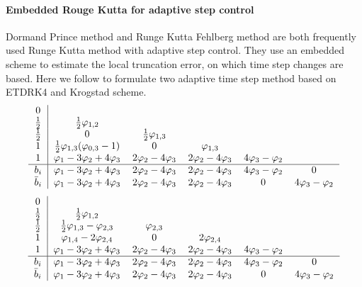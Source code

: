 \paragraph{Embedded Rouge Kutta for adaptive step control}
Dormand Prince method and Runge Kutta Fehlberg method
are
both frequently used Runge Kutta method with adaptive step control.
They use an embedded scheme to estimate the local truncation error, on which
time step changes are based. Here we follow to formulate two
adaptive time step method based on ETDRK4 and Krogstad scheme.
\begin{equation}
  \label{eq:etdrk4Adapt}
  \begin{tabular}{c | c c c c c}
    0 & & & & &\\
    $\frac{1}{2}$  & $\frac{1}{2}\varphi_{1, 2}$ &&&&\\
    $\frac{1}{2}$ & 0 & $\frac{1}{2}\varphi_{1, 3}$ &&&\\
    1 & $\frac{1}{2}\varphi_{1,3}(\varphi_{0,3}-1)$ & 0 & $\varphi_{1,3}$ & &\\
    1 & $\varphi_{1}-3\varphi_{2}+4\varphi_{3}$ & $2\varphi_{2}-4\varphi_{3}$
          & $2\varphi_{2}-4\varphi_{3}$ & $4\varphi_{3}-\varphi_{2}$ & \\
    \hline
    $b_i$  & $\varphi_{1}-3\varphi_{2}+4\varphi_{3}$ & $2\varphi_{2}-4\varphi_{3}$
          & $2\varphi_{2}-4\varphi_{3}$ & $4\varphi_{3}-\varphi_{2}$  & 0\\
   $\bar{b}_i$  & $\varphi_{1}-3\varphi_{2}+4\varphi_{3}$ & $2\varphi_{2}-4\varphi_{3}$
          & $2\varphi_{2}-4\varphi_{3}$ & 0 & $4\varphi_{3}-\varphi_{2}$ \\
  \end{tabular}
\end{equation}
\begin{equation}
  \label{eq:krogstadAdapt}
  \begin{tabular}{c | c c c c c}
    0 & & & & & \\
    $\frac{1}{2}$  & $\frac{1}{2}\varphi_{1, 2}$ &&&&\\
    $\frac{1}{2}$ & $\frac{1}{2}\varphi_{1, 3} -\varphi_{2, 3}$ & $\varphi_{2, 3}$ &&&\\
    1 & $\varphi_{1,4}-2\varphi_{2,4}$ & 0 & $2\varphi_{2,4}$ & & \\
    1 & $\varphi_{1}-3\varphi_{2}+4\varphi_{3}$ & $2\varphi_{2}-4\varphi_{3}$
          & $2\varphi_{2}-4\varphi_{3}$ & $4\varphi_{3}-\varphi_{2}$ & \\
    \hline
    $b_i$ & $\varphi_{1}-3\varphi_{2}+4\varphi_{3}$ & $2\varphi_{2}-4\varphi_{3}$
          & $2\varphi_{2}-4\varphi_{3}$ & $4\varphi_{3}-\varphi_{2}$ & 0 \\
    $\bar{b}_i$  & $\varphi_{1}-3\varphi_{2}+4\varphi_{3}$ & $2\varphi_{2}-4\varphi_{3}$
          & $2\varphi_{2}-4\varphi_{3}$ & 0 & $4\varphi_{3}-\varphi_{2}$ \\
  \end{tabular}
\end{equation}

